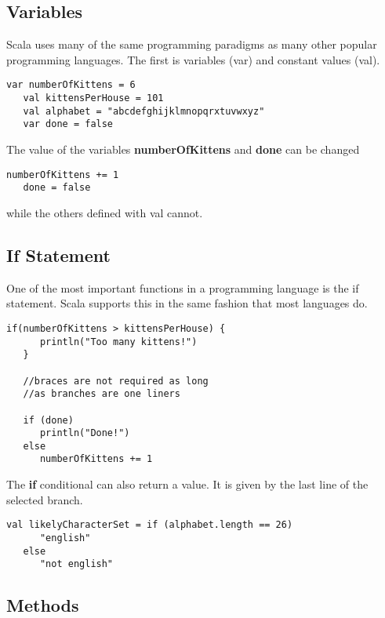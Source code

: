 \documentclass[12pt, letterpaper]{report}
\begin{document}
\subsection{Variables}

Scala uses many of the same programming paradigms as many other popular programming languages. The first is  variables (var) and constant values (val).

\begin{lstlisting}[style=scala]
   var numberOfKittens = 6
   val kittensPerHouse = 101
   val alphabet = "abcdefghijklmnopqrxtuvwxyz"
   var done = false
\end{lstlisting}

\noindent The value of the variables \textbf{numberOfKittens} and \textbf{done} can be changed

\begin{lstlisting}[style=scala]
   numberOfKittens += 1
   done = false
\end{lstlisting}

\noindent while the others defined with val cannot.

\subsection{If Statement}

One of the most important functions in a programming language is the if statement. Scala supports this in the same fashion that most languages do.

\begin{lstlisting}[style=scala]
   if(numberOfKittens > kittensPerHouse) {
      println("Too many kittens!")
   }

   //braces are not required as long 
   //as branches are one liners

   if (done) 
      println("Done!")
   else
      numberOfKittens += 1

\end{lstlisting}

\noindent The \textbf{if} conditional can also return a value. It is given by the last line of the selected branch.

\begin{lstlisting}[style=scala]
   val likelyCharacterSet = if (alphabet.length == 26) 
      "english"
   else
      "not english"
\end{lstlisting}

\subsection{Methods}
\end{document}
